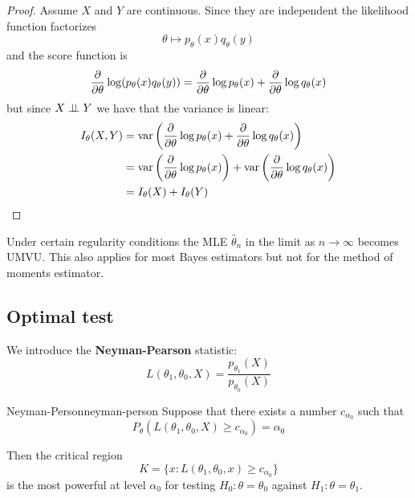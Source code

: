 \documentclass[12pt]{extarticle}
\begin{document}
\begin{proof}
	Assume $X$ and $Y$ are continuous.
	Since they are independent the likelihood function factorizes
	\begin{equation}
		\theta \mapsto p_\theta(x)q_\theta(y)
	\end{equation}
	and the score function is
	\begin{equation}
		\pdv{\theta} \log(p_\theta(x)q_\theta(y)) = \pdv{\theta} \log p_\theta(x) + \pdv{\theta} \log q_\theta(x)
	\end{equation}
	but since $X \perp \!\!\! \perp Y$ we have that the variance is linear:
	\begin{align}
		I_\theta(X, Y) & = \var \left(\pdv{\theta} \log p_\theta(x) + \pdv{\theta} \log q_\theta(x)\right)                   \\
		               & = \var \left(\pdv{\theta} \log p_\theta(x)\right) + \var \left(\pdv{\theta} \log q_\theta(x)\right) \\
		               & = I_\theta(X) + I_\theta(Y)
	\end{align}
\end{proof}

Under certain regularity conditions the MLE $\hat \theta_n$ in the limit as $n \to \infty$ becomes UMVU.
This also applies for most Bayes estimators but not for the method of moments estimator.

\subsection{Optimal test}

We introduce the \textbf{Neyman-Pearson} statistic:
\begin{equation}
	L(\theta_1, \theta_0, X) = \frac{p_{\theta_1}(X)}{p_{\theta_0}(X)}
\end{equation}

\begin{theorem}{Neyman-Person}{neyman-person}
	Suppose that there exists a number $c_{\alpha_0}$ such that
	\begin{equation}
		P_\theta(L(\theta_1, \theta_0, X)\geq c_{\alpha_0})= \alpha_0
	\end{equation}

	Then the critical region
	\begin{equation}
		K = \{ x : L(\theta_1, \theta_0, x) \geq c_{\alpha_0} \}
	\end{equation}
	is the most powerful at level $\alpha_0$ for testing $H_0: \theta = \theta_0$ against $H_1: \theta = \theta_1$.
\end{theorem}
\end{document}
